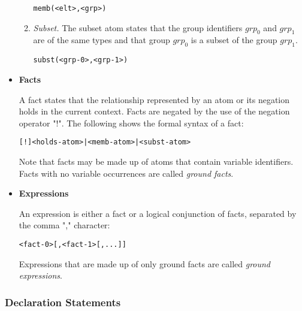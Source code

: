 \documentclass[11pt]{report}
\newenvironment{vverbatim}
{
  \begin{alltt}
}
{
    \vspace{-\baselineskip}
  \end{alltt}
}
\begin{document}
\begin{itemize}
\begin{enumerate}
                  \begin{vverbatim}
  memb(<elt>, <grp>)
                  \end{vverbatim}

                \item
                  {\em Subset.} The subset atom states that the group
                  identifiers $grp_0$ and $grp_1$ are of the same types and
                  that group $grp_0$ is a subset of the group $grp_1$.

                  \begin{vverbatim}
  subst(<grp-0>, <grp-1>)
                  \end{vverbatim}

              \end{enumerate}

            \item
              {\bf Facts}

              A fact states that the relationship represented by an atom or
              its negation holds in the current context. Facts are negated by
              the use of the negation operator "!". The following shows the
              formal syntax of a fact:

              \begin{vverbatim}
  [!]<holds-atom>|<memb-atom>|<subst-atom>
              \end{vverbatim}

              Note that facts may be made up of atoms that contain variable
              identifiers. Facts with no variable occurrences are called
              {\em ground facts}.

            \item
              {\bf Expressions}

              An expression is either a fact or a logical conjunction of facts,
              separated by the comma "," character:

              \begin{vverbatim}
  <fact-0> [, <fact-1> [, ...]]
              \end{vverbatim}

              Expressions that are made up of only ground facts are called
              {\em ground expressions}.
          \end{itemize}

        \subsubsection{Declaration Statements}
\end{document}
